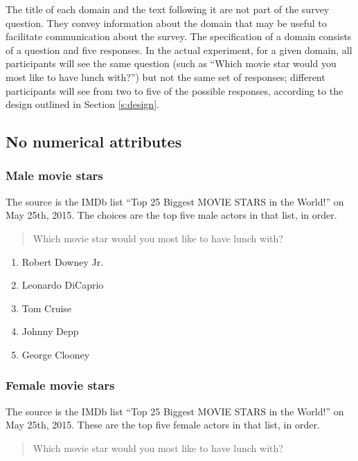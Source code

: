 \documentclass[11pt,letter]{amsart}
\begin{document}
The title of each domain and the text following it are not part of the survey question. They convey information about the domain that may be useful to facilitate communication about the survey.
The specification of a domain consists of a question and five responses.
In the actual experiment, for a given domain, all participants will see the same question (such as ``Which movie star would you most like to have lunch with?'') but not the same set of responses; different participants will see from two to five of the possible responses, according to the design outlined in Section \ref{s:design}.

\subsection{No numerical attributes}

\subsubsection{Male movie stars}

The source is the IMDb list ``Top 25 Biggest MOVIE STARS in the World!'' on
May 25th, 2015. The choices are the top five male actors in that list, in
order.

\begin{quotation}
Which movie star would you most like to have lunch with?
\end{quotation}

\begin{enumerate}
\item Robert Downey Jr. 

\item Leonardo DiCaprio 

\item Tom Cruise 

\item Johnny Depp 

\item George Clooney
\end{enumerate}

\subsubsection{Female movie stars}

The source is the IMDb list ``Top 25 Biggest MOVIE STARS in the World!'' on
May 25th, 2015. These are the top five female actors in that list, in order.

\begin{quotation}
Which movie star would you most like to have lunch with?
\end{quotation}
\end{document}
